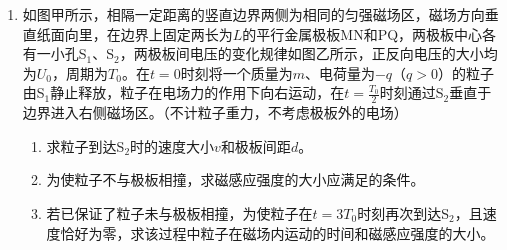 \documentclass[\gkver]{gaokaozhenti}
\begin{document}
\begin{enumerate}
{$\cos\theta=\frac{R-h}{R}$ ③

根据牛顿第二定律，对物体有

$mg\tan\theta=ma$ ④

对工件和物体整体有

$F-\mu_{2}(M+m)g=(M+m)a$ ⑤

联立②③④⑤式，代入数据得 $F=8.5\UN$ ⑥

②设物体平抛运动的时间为 $t$，水平位移为 $x_{1}$，物块落点与 B 间的距离为 $x_{2}$，由运动学公式可得

$h=\frac{1}{2}gt^{2}$ ⑦

$x_{1}=vt$ ⑧

$x_{2}=x_{1}-R\sin\theta$ ⑨

联立②③⑦⑧⑨式，代入数据得 $x_{2}=0.4\Um$ ⑩
}

\item
如图甲所示，相隔一定距离的竖直边界两侧为相同的匀强磁场区，磁场方向垂直纸面向里，在边界上固定两长为$L$的平行金属极板MN和PQ，两极板中心各有一小孔S$_{1}$、S$_{2}$，两极板间电压的变化规律如图乙所示，正反向电压的大小均为$U_{0}$，周期为$T_{0}$。在$t=0$时刻将一个质量为$m$、电荷量为$-q$（$q>0$）的粒子由S$_{1}$静止释放，粒子在电场力的作用下向右运动，在$t=\frac{T_{0}}{2}$时刻通过S$_{2}$垂直于边界进入右侧磁场区。（不计粒子重力，不考虑极板外的电场）
\begin{enumerate}
	\item
	求粒子到达S$_{2}$时的速度大小$v$和极板间距$d$。
	\item
	为使粒子不与极板相撞，求磁感应强度的大小应满足的条件。
	\item
	若已保证了粒子未与极板相撞，为使粒子在$t=3T_{0}$时刻再次到达S$_{2}$，且速度恰好为零，求该过程中粒子在磁场内运动的时间和磁感应强度的大小。
\end{enumerate}
\end{enumerate}
\end{document}
